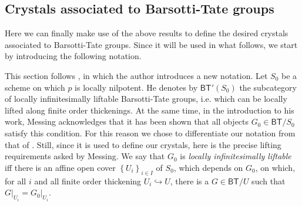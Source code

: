 \subsection{Crystals associated to Barsotti-Tate groups}
\label{sec:CrystalsAssociatedToBTGroups}
Here we can finally make use of the above results to define the desired crystals
associated to Barsotti-Tate groups.
Since it will be used in what follows,
we start by introducing the following notation.


\begin{rem}[]\label{rem:LocallyLiftableBTG}
	This section follows \cite[Chpater IV, \S2]{Messing},
	in which the author introduces a new notation.
	Let \(S_0\) be a scheme on which \(p\) is locally nilpotent.
	He denotes by $\mathsf{BT}'(S_0)$ the subcategory of
	locally infinitesimally liftable Barsotti-Tate groups, i.e$.$ 
	which can be locally lifted along finite order thickenings.
	At the same time, in the introduction to his work, Messing acknowledges that
	it has been shown that all objects $G_0 \in \mathsf{BT}/S_0$ satisfy
	this condition.
	For this reason we chose to differentiate our notation from that of \cite{Messing}.
	Still, since it is used to define our crystals, here is the precise lifting
	requirements asked by Messing.
	We say that $G_0$ is \emph{locally infinitesimally liftable} iff
	there is an affine open cover $\left\{ U_i \right\}_{i \in I}$ of $S_0$, which depends on $G_0$, 
	on which, for all $i$ and all finite order thickening $U_i \hookrightarrow U$,
	there is a $G \in \mathsf{BT}/U$ such that
	$\left.G\right|_{U_i} = \left.G_0\right|_{U_i}$.
\end{rem}


